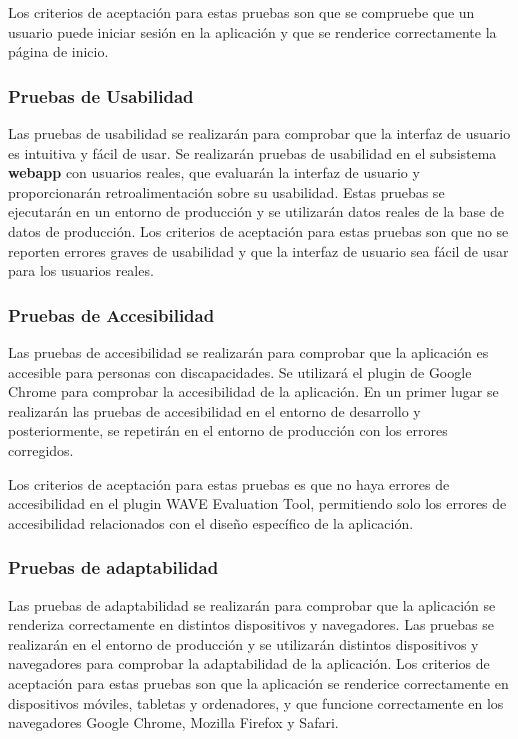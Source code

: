 Los criterios de aceptación para estas pruebas son que se compruebe que un usuario puede iniciar sesión en la aplicación y que se renderice correctamente la página de inicio.

\subsubsection{Pruebas de Usabilidad}
Las pruebas de usabilidad se realizarán para comprobar que la interfaz de usuario es intuitiva y fácil de usar.
Se realizarán pruebas de usabilidad en el subsistema \textbf{webapp} con usuarios reales, que evaluarán la interfaz de usuario y proporcionarán retroalimentación sobre su usabilidad.
Estas pruebas se ejecutarán en un entorno de producción y se utilizarán datos reales de la base de datos de producción.
Los criterios de aceptación para estas pruebas son que no se reporten errores graves de usabilidad y que la interfaz de usuario sea fácil de usar para los usuarios reales.

\subsubsection{Pruebas de Accesibilidad}
Las pruebas de accesibilidad se realizarán para comprobar que la aplicación es accesible para personas con discapacidades.
Se utilizará el plugin de Google Chrome 
 para comprobar la accesibilidad de la aplicación.
En un primer lugar se realizarán las pruebas de accesibilidad en el entorno de desarrollo y posteriormente, se repetirán en el entorno de producción con los errores corregidos.

Los criterios de aceptación para estas pruebas es que no haya errores de accesibilidad en el plugin WAVE Evaluation Tool,
permitiendo solo los errores de accesibilidad relacionados con el diseño específico de la aplicación.


\subsubsection{Pruebas de adaptabilidad}
Las pruebas de adaptabilidad se realizarán para comprobar que la aplicación se renderiza correctamente en distintos dispositivos y navegadores.
Las pruebas se realizarán en el entorno de producción y se utilizarán distintos dispositivos y navegadores para comprobar la adaptabilidad de la aplicación.
Los criterios de aceptación para estas pruebas son que la aplicación se renderice correctamente en dispositivos móviles, tabletas y ordenadores, y que funcione correctamente en los navegadores Google Chrome, Mozilla Firefox y Safari.


